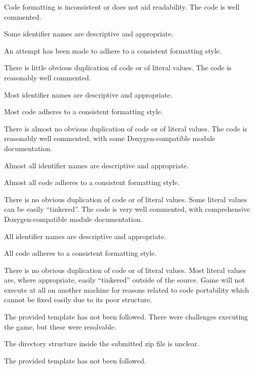 \documentclass{../fal_assignment}
\begin{document}
\begin{markingrubric}
            \par Code formatting is inconsistent or does not aid readability.
        \grade The code is well commented.
            \par Some identifier names are descriptive and appropriate.
            \par An attempt has been made to adhere to a consistent formatting style.
             \par There is little obvious duplication of code or of literal values.           
        \grade The code is reasonably well commented.
            \par Most identifier names are descriptive and appropriate.
            \par Most code adheres to a consistent formatting style.
             \par There is almost no obvious duplication of code or of literal values.   
        \grade The code is reasonably well commented, with some Doxygen-compatible module documentation.
            \par Almost all identifier names are descriptive and appropriate.
            \par Almost all code adheres to a consistent formatting style.
             \par There is no obvious duplication of code or of literal values. Some literal values can be easily ``tinkered''. 
        \grade The code is very well commented, with comprehensive Doxygen-compatible module documentation.
            \par All identifier names are descriptive and appropriate.
            \par All code adheres to a consistent formatting style.
             \par There is no obvious duplication of code or of literal values. Most literal values are, where appropriate, easily ``tinkered'' outside of the source.  
%
        \grade\fail Game will not execute at all on another machine for reasons related to code portability which cannot be fixed easily due to its poor structure.
            \par The provided template has not been followed.
        \grade There were challenges executing the game, but these were resolvable.
            \par The directory structure inside the submitted zip file is unclear.
            \par The provided template has not been followed.

\end{markingrubric}
\end{document}
